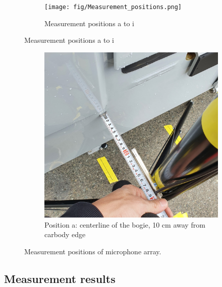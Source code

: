 \begin{figure}[H]
     \centering
     \begin{subfigure}[b]{\textwidth}
         \centering
         \texttt{[image: fig/Measurement\_positions.png]}
         \caption{Measurement positions a to i}
     \end{subfigure}
\end{figure}

\begin{figure}[H]\ContinuedFloat
    \centering
    \begin{subfigure}[b]{0.6\textwidth}
         \centering
         \includegraphics[width=\linewidth]{fig/position_of_microphones.jpg}
         \caption{Position a: centerline of the bogie, 10 cm away from carbody edge}
         \label{fig:position_a}
     \end{subfigure}
     \caption{Measurement positions of microphone array.}
     \label{fig:microphoneposition}
\end{figure}

\subsection*{Measurement results}


